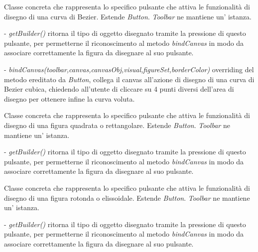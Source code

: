 Classe concreta che rappresenta lo specifico pulsante che attiva le funzionalit\` a di disegno di una curva di Bezier.
Estende \textit{Button}.
\textit{Toolbar} ne mantiene un' istanza.
\begin{elencopuntato}[\subsubsecindent]
\item[-] \textit{getBuilder()} ritorna il tipo di oggetto disegnato tramite la pressione di questo pulsante, per permetterne il riconoscimento al metodo \textit{bindCanvas} in modo da associare correttamente la figura da disegnare al suo pulsante.
\item[-]  \textit{bindCanvas(toolbar,canvas,canvasObj,visual,figureSet,borderColor)} overriding del metodo ereditato da \textit{Button}, collega il canvas all'azione di disegno di una curva di Bezier cubica,  chiedendo all'utente di cliccare su 4 punti diversi dell'area di disegno per ottenere infine la curva voluta.
\end{elencopuntato}

Classe concreta che rappresenta lo specifico pulsante che attiva le funzionalit\` a di disegno di una figura quadrata o rettangolare.
Estende \textit{Button}.
\textit{Toolbar} ne mantiene un' istanza.
\begin{elencopuntato}[\subsubsecindent]
\item[-] \textit{getBuilder()} ritorna il tipo di oggetto disegnato tramite la pressione di questo pulsante, per permetterne il riconoscimento al metodo \textit{bindCanvas} in modo da associare correttamente la figura da disegnare al suo pulsante.
\end{elencopuntato}

Classe concreta che rappresenta lo specifico pulsante che attiva le funzionalit\` a di disegno di una figura rotonda o elissoidale.
Estende \textit{Button}.
\textit{Toolbar} ne mantiene un' istanza.
\begin{elencopuntato}[\subsubsecindent]
\item[-] \textit{getBuilder()} ritorna il tipo di oggetto disegnato tramite la pressione di questo pulsante, per permetterne il riconoscimento al metodo \textit{bindCanvas} in modo da associare correttamente la figura da disegnare al suo pulsante.
\end{elencopuntato}

